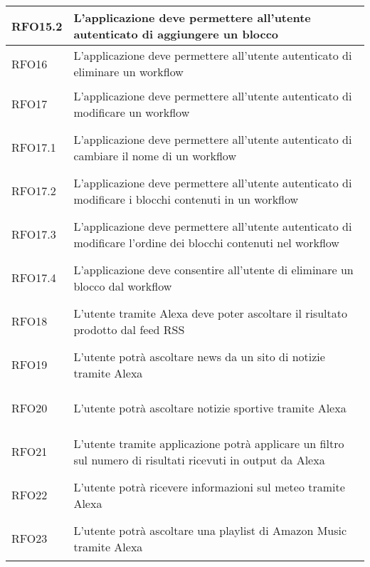 \begin{longtable}{|>{\centering}m{5em}|m{25em}|}
	\hypertarget{RFO15.2}{RFO15.2} & L'applicazione deve permettere all'utente autenticato di aggiungere un blocco\\ \hline
	
	\hypertarget{RFO16}{RFO16} & L'applicazione deve permettere all'utente autenticato di eliminare un workflow\\ \hline
	
	\hypertarget{RFO17}{RFO17} & L'applicazione deve permettere all'utente autenticato di modificare un workflow\\ \hline
	
	\hypertarget{RFO17.1}{RFO17.1} & L'applicazione deve permettere all'utente autenticato di cambiare il nome di un workflow\\ \hline
	
	\hypertarget{RFO17.2}{RFO17.2} & L'applicazione deve permettere all'utente autenticato di modificare i blocchi contenuti in un workflow\\ \hline
	
	\hypertarget{RFO17.3}{RFO17.3} & L'applicazione deve permettere all'utente autenticato di modificare l'ordine dei blocchi contenuti nel workflow\\ \hline
	
	\hypertarget{RFO17.4}{RFO17.4} & L'applicazione deve consentire all'utente di eliminare un blocco dal workflow\\ \hline
	
	\hypertarget{RFO18}{RFO18} & L'utente tramite Alexa deve poter ascoltare il risultato prodotto dal feed RSS\\ \hline
	
	\hypertarget{RFO19}{RFO19} & L'utente potrà ascoltare news da un sito di notizie tramite Alexa\\ \hline
	
	\hypertarget{RFO20}{RFO20} & L'utente potrà ascoltare notizie sportive tramite Alexa\\ \hline
	
	\hypertarget{RFO21}{RFO21} & L'utente tramite applicazione potrà applicare un filtro sul numero di risultati ricevuti in output da Alexa\\ \hline
	
	\hypertarget{RFO22}{RFO22} & L'utente potrà ricevere informazioni sul meteo tramite Alexa\\ \hline
	
	\hypertarget{RFO23}{RFO23} & L'utente potrà ascoltare una playlist di Amazon Music tramite Alexa\\ \hline
	

\end{longtable}
